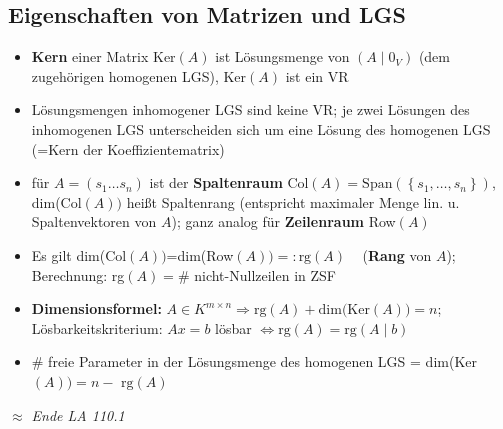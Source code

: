 \documentclass[10pt,a4paper]{article}
\begin{document}
\subsection{Eigenschaften von Matrizen und LGS}
\begin{itemize}


\item \textbf{Kern} einer Matrix Ker$(A)$ ist Lösungsmenge von $(A\mid 0_{V})$ (dem zugehörigen homogenen LGS), Ker$(A)$ ist ein VR
\item Lösungsmengen inhomogener LGS sind keine VR; je zwei Lösungen des inhomogenen LGS unterscheiden sich um eine Lösung des homogenen LGS (=Kern der Koeffizientematrix)
\item für $A=(s_{1}\dotsc s_{n})$ ist der \textbf{Spaltenraum} Col$(A)=\text{Span}(\left\lbrace s_{1},\dotsc, s_{n}\right\rbrace)$, dim(Col$(A))$ heißt Spaltenrang (entspricht maximaler Menge lin. u. Spaltenvektoren von $A$); ganz analog für \textbf{Zeilenraum} Row$(A)$
\item Es gilt dim(Col$(A))$=dim(Row$(A))=:\text{rg}(A)\;\;\;$ (\textbf{Rang} von $A$); Berechnung: rg$(A)= \#$ nicht-Nullzeilen in ZSF
\item \textbf{Dimensionsformel: }$A\in K^{m \times n}\Rightarrow\text{rg}(A)+\text{dim(Ker}(A))=n$;  Lösbarkeitskriterium: $Ax=b$ lösbar $\Leftrightarrow \text{rg}(A)=\text{rg}(A \mid b)$
\item \# freie Parameter in der Lösungsmenge des homogenen LGS = dim(Ker$(A))=n-\text{ rg}(A)$
\end{itemize}
\textit{$\approx$ Ende LA 110.1}
\end{document}
